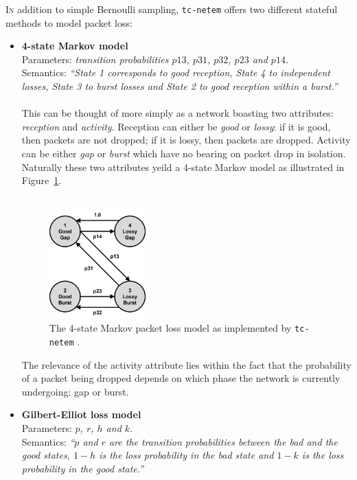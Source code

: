 \lettrine{I}{n} addition to simple Bernoulli sampling, \texttt{tc-netem} offers two different stateful methods to
model packet
loss\cite{tc_netem_8_man}:
\begin{itemize}
    \item \textbf{4-state Markov model} \\
    Parameters: \emph{transition probabilities $p13$, $p31$, $p32$, $p23$ and $p14$.} \\
    Semantics: \emph{``State 1 corresponds to good reception, State 4 to independent losses, State 3 to burst losses
    and State 2 to good reception within a burst.''} \\ \\
    This can be thought of more simply as a network boasting two attributes: \emph{reception} and \emph{activity}.
    Reception can either be \emph{good} or \emph{lossy}: if it is good, then packets are not dropped; if it is lossy,
    then packets are dropped. Activity can be either \emph{gap} or \emph{burst} which have no bearing on packet drop
    in isolation. Naturally these two attributes yeild a 4-state Markov model as illustrated in
    Figure~\ref{fig:chapter_3_design-tc_netem_4_state_markov_diagram}. \\ \\
    \begin{figure}[!h]
        \includegraphics[width=0.35\textwidth]{images/chapter_3_design/tc_netem_4_state_markov_diagram}
        \centering
        \caption{The 4-state Markov packet loss model as implemented by \texttt{tc-netem}\cite{tc_netem_src}
        .}\label{fig:chapter_3_design-tc_netem_4_state_markov_diagram}
    \end{figure}

    The relevance of the activity attribute lies within the fact that the probability of a packet being dropped
    depends on which phase the network is currently undergoing: gap or burst.
    \item \textbf{Gilbert-Elliot loss model} \\
    Parameters: \emph{$p$, $r$, $h$ and $k$.} \\
    Semantics: \emph{``$p$ and $r$ are the transition probabilities between the bad and the good states, $1-h$ is the
    loss probability in the bad state and $1-k$ is the loss probability in the good state.''}
\end{itemize}

